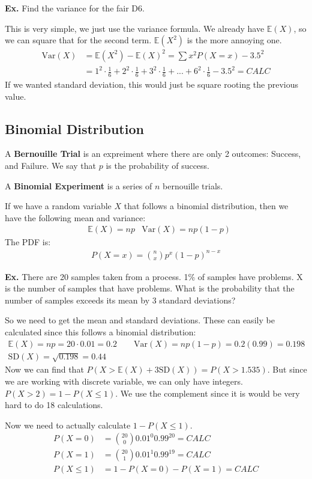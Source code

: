 \documentclass[12pt,letterpaper]{article} \usepackage{amsmath} \usepackage{graphicx} \usepackage[margin=1in]{geometry} \usepackage{longtable}  \usepackage{amssymb}
\begin{document}
	\begin{mdframed}
		\textbf{Ex.} Find the variance for the fair D6.
		
		This is very simple, we just use the variance formula. We already have $\mathbb E(X)$, so we can square that for the second term. $\mathbb E(X^2)$ is the more annoying one. 
		\begin{align*}
			\text{Var}(X) &= \mathbb E (X^2) - \mathbb E(X)^2 = \sum x^2 P(X=x) - 3.5^2\\
			&= 1^2 \cdot \frac{1}{6} + 2^2 \cdot \frac{1}{6} + 3^2 \cdot \frac{1}{6} + ... + 6^2 \cdot \frac{1}{6} - 3.5^2 = CALC
		\end{align*}
	If we wanted standard deviation, this would just be square rooting the previous value. 
	\end{mdframed}
	
	\subsection{Binomial Distribution}
	A \textbf{Bernouille Trial} is an expreiment where there are only 2 outcomes: Success, and Failure. We say that $p$ is the probability of success. 
	
	A \textbf{Binomial Experiment} is a series of $n$ bernouille trials.
	
	If we have a random variable $X$ that follows a binomial distribution, then we have the following mean and variance:
	\begin{align*}
		&\mathbb E(X) = np &\text{Var}(X) = np(1-p)
	\end{align*}
	The PDF is:
	\begin{align*}
		P(X=x)= \binom{n}{x}p^x(1-p)^{n-x}
	\end{align*}

	\begin{mdframed}
		\textbf{Ex. }There are 20 samples taken from a process. 1\% of samples have problems. X is the number of samples that have problems. What is the probability that the number of samples exceeds its mean by 3 standard deviations?
		
		So we need to get the mean and standard deviations. These can easily be calculated since this follows a binomial distribution:
		\begin{align*}
			\mathbb E(X) = np = 20\cdot 0.01 = 0.2 \qquad \text{Var}(X) = np(1-p) = 0.2(0.99) = 0.198\\
			\text{SD}(X) = \sqrt{0.198} = 0.44
		\end{align*}
		Now we can find that $P(X>\mathbb E(X) + 3\text{SD}(X)) = P(X > 1.535)$. But since we are working with discrete variable, we can only have integers. $P(X>2) = 1- P(X\le 1)$. We use the complement since it is would be very hard to do 18 calculations. 
		
		Now we need to actually calculate $1-P(X\le 1)$.
		\begin{align*}
			P(X=0) &= \binom{20}{0}0.01^0 0.99^{20} = CALC\\
			P(X=1) &= \binom{20}{1}0.01^1 0.99^{19} = CALC\\
			P(X\le 1) &= 1- P(X=0) - P(X=1) = CALC
		\end{align*}
	\end{mdframed}
	
\end{document}

